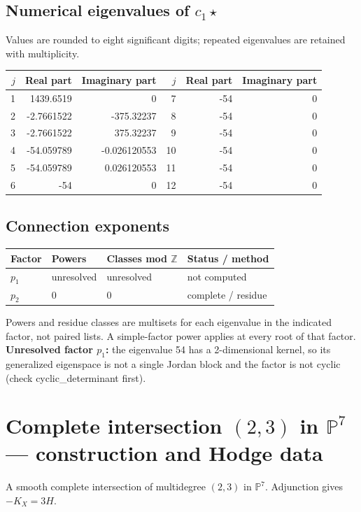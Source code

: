 \documentclass[10pt,a4paper]{article}
\begin{document}
\subsection*{Numerical eigenvalues of $c_1\star$}
Values are rounded to eight significant digits; repeated eigenvalues are retained with multiplicity.
\begin{center}\small\begin{tabular}{rrr@{\qquad}rrr}\toprule $j$ & Real part & Imaginary part & $j$ & Real part & Imaginary part\\\midrule
1 & 1439.6519 & 0 & 7 & -54 & 0\\
2 & -2.7661522 & -375.32237 & 8 & -54 & 0\\
3 & -2.7661522 & 375.32237 & 9 & -54 & 0\\
4 & -54.059789 & -0.026120553 & 10 & -54 & 0\\
5 & -54.059789 & 0.026120553 & 11 & -54 & 0\\
6 & -54 & 0 & 12 & -54 & 0\\
\bottomrule\end{tabular}\end{center}
\subsection*{Connection exponents}
\begin{center}\begin{tabular}{llll}\toprule Factor & Powers & Classes mod $\mathbb Z$ & Status / method\\\midrule
$p_{1}$ & unresolved & unresolved & not computed\\
$p_{2}$ & $0$ & $0$ & complete / residue\\
\bottomrule\end{tabular}\end{center}
Powers and residue classes are multisets for each eigenvalue in the indicated factor, not paired lists. A simple-factor power applies at every root of that factor.
\textbf{Unresolved factor $p_{1}$:} the eigenvalue 54 has a 2-dimensional kernel, so its generalized eigenspace is not a single Jordan block and the factor is not cyclic (check cyclic\_determinant first).
\clearpage\section*{Complete intersection $(2,3)$ in $\mathbb P^{7}$ --- construction and Hodge data}\label{entry:QC5-001}
A smooth complete intersection of multidegree $(2,3)$ in $\mathbb P^{7}$.
Adjunction gives $-K_X=3H$.
\end{document}
